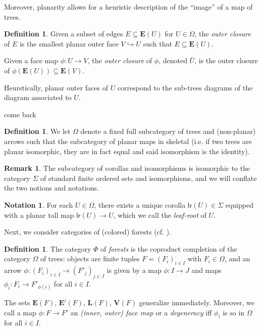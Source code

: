 \documentclass[a4paper,10pt
,draft
]{article}%
\numberwithin{equation}{section}
\numberwithin{figure}{section}
\theoremstyle{definition} %
\newtheorem{definition}[equation]{Definition}%
\newtheorem{remark}[equation]{Remark}%
\newtheorem{notation}[equation]{Notation}%
\newcommand{\into}{\hookrightarrow}%
\newcommand{\1}{\ensuremath{\mathbbm 1}}%
\begin{document}
Moreover, planarity allows for a heuristic description of the ``image'' of a map of trees.
\begin{definition}
      Given a subset of edges $E \subseteq \boldsymbol{E}(U)$ for $U \in \Omega$,
      the \textit{outer closure} of $E$ is
      the smallest planar outer face $V \into U$ such that $E \subseteq \boldsymbol{E}(U)$.
      
      Given a face map $\phi \colon U \to V$, the \textit{outer closure} of $\phi$, denoted $\bar{U}$,
      is the outer closure of $\phi(\boldsymbol{E}(U)) \subseteq \boldsymbol{E}(V)$.
\end{definition}
Heurstically, planar outer faces of $U$ correspond to the sub-trees diagrams of the diagram associated to $U$.


{\color{blue} come back}


      

\begin{definition}
      We let $\Omega$ denote a fixed full subcategory of trees and (non-planar) arrows
      such that the subcategory of planar maps in skeletal (i.e. if two trees are planar isomorphic, they are in fact equal and said isomorphism is the identity).
\end{definition}

\begin{remark}
      The subcategory of corollas and isomorphisms is isomorphic to the category $\Sigma$ of standard finite ordered sets and isomorphisms,
      and we will conflate the two notions and notations.
\end{remark}

\begin{notation}
      \label{LR_NOT}
      For each $U \in \Omega$, there exists a unique corolla $\mathsf{lr}(U) \in \Sigma$ equipped with a planar tall map $\mathsf{lr}(U) \to U$,
      which we call the \textit{leaf-root} of $U$.
\end{notation}


Next, we consider categories of (colored) forests (cf. \cite[Defn. 2.56]{BP_HGOP}).

\begin{definition}
      The category $\Phi$ of \textit{forests} is the coproduct completion of the category $\Omega$ of trees:
      objects are finite tuples $F = (F_i)_{i \in I}$ with $F_i \in \Omega$,
      and an arrow $\phi \colon (F_i)_{i \in I} \to (F'_j)_{j \in J}$ is given by
      a map $\phi \colon I \to J$ and
      maps $\phi_i \colon F_i \to F'_{\phi(i)}$ for all $i \in I$.
     
      The sets $\boldsymbol{E}(F)$, $\boldsymbol{E}^i(F)$, $\boldsymbol{L}(F)$, $\boldsymbol{V}(F)$ generalize immediately.
      Moreover, we call a map $\phi \colon F \to F'$ an \textit{(inner, outer) face map} or a \textit{degeneracy} iff
      $\phi_i$ is so in $\Omega$ for all $i \in I$.
\end{definition}
\end{document}
